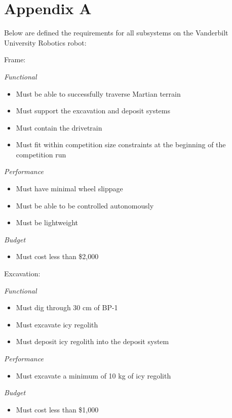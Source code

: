 \documentclass[class=article, crop=false]{standalone}
\begin{document}
 
\newpage
\section{Appendix A}

\noindent
\Large Below are defined the requirements for all subsystems on the Vanderbilt University Robotics robot: \vspace*{0.1in}


\noindent
\normalsize
Frame:
\footnotesize

\vspace*{0.05in}
\noindent
\emph{Functional}
\begin{itemize}
 \item Must be able to successfully traverse Martian terrain
 \item Must support the excavation and deposit systems
 \item Must contain the drivetrain
 \item Must fit within competition size constraints at the beginning of the competition run
\end{itemize}
\noindent
\emph{Performance}
\begin{itemize}
 \item Must have minimal wheel slippage
 \item Must be able to be controlled autonomously
 \item Must be lightweight
\end{itemize}
\noindent
\emph{Budget}
\begin{itemize}
 \item Must cost less than \$2,000
\end{itemize}
\vspace*{0.1in}


\noindent
\normalsize
Excavation:
\footnotesize

\vspace*{0.05in}
\noindent
\emph{Functional}
\begin{itemize}
 \item Must dig through 30 cm of BP-1
 \item Must excavate icy regolith 
 \item Must deposit icy regolith into the deposit system
\end{itemize}
\noindent
\emph{Performance}
\begin{itemize}
 \item Must excavate a minimum of 10 kg of icy regolith
\end{itemize}
\noindent
\emph{Budget}
\begin{itemize}
 \item Must cost less than \$1,000
\end{itemize}
\end{document}
